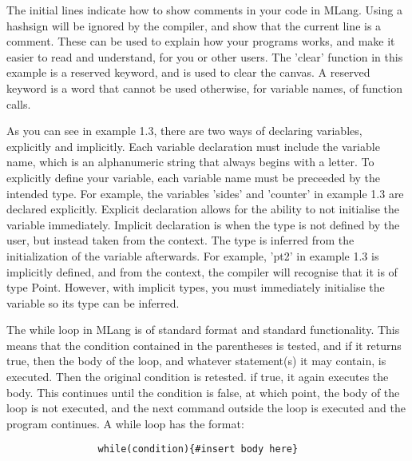 \documentclass{l3proj}
\begin{document}
The initial lines indicate how to show comments in your code in MLang. Using a hashsign will be ignored by the compiler, and show that the current line is a comment. These can be used to explain how your programs works, and make it easier to read and understand, for you or other users. The 'clear' function in this example is a reserved keyword, and is used to clear the canvas. A reserved keyword is a word that cannot be used otherwise, for variable names, of function calls.

As you can see in example 1.3, there are two ways of declaring variables, explicitly and implicitly. Each variable declaration must include the variable name, which is an alphanumeric string that always begins with a letter. To explicitly define your variable, each variable name must be preceeded by the intended type. For example, the variables 'sides' and 'counter' in example 1.3 are declared explicitly. Explicit declaration allows for the ability to not initialise the variable immediately. Implicit declaration is when the type is not defined by the user, but instead taken from the context. The type is inferred from the initialization of the variable afterwards. For example, 'pt2' in example 1.3 is implicitly defined, and from the context, the compiler will recognise that it is of type Point. However, with implicit types, you must immediately initialise the variable so its type can be inferred.

The while loop in MLang is of standard format and standard functionality. This means that the condition contained in the parentheses is tested, and if it returns true, then the body of the loop, and whatever statement(s) it may contain, is executed. Then the original condition is retested. if true, it again executes the body. This continues until the condition is false, at which point, the body of the loop is not executed, and the next command outside the loop is executed and the program continues. A while loop has the format: \begin{lstlisting}
				while(condition){#insert body here} 
		\end{lstlisting}
\end{document}
